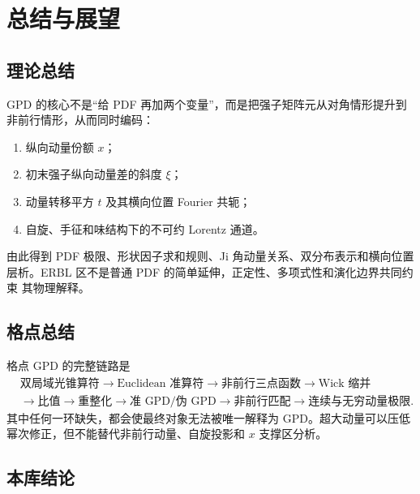 \documentclass[12pt,a4paper]{ctexart}
\theoremstyle{definition}
\begin{document}
\section{总结与展望}

\subsection{理论总结}

GPD 的核心不是“给 PDF 再加两个变量”，而是把强子矩阵元从对角情形提升到
非前行情形，从而同时编码：
\begin{enumerate}[leftmargin=*]
  \item 纵向动量份额 $x$；
  \item 初末强子纵向动量差的斜度 $\xi$；
  \item 动量转移平方 $t$ 及其横向位置 Fourier 共轭；
  \item 自旋、手征和味结构下的不可约 Lorentz 通道。
\end{enumerate}
由此得到 PDF 极限、形状因子求和规则、Ji 角动量关系、双分布表示和横向位置
层析。ERBL 区不是普通 PDF 的简单延伸，正定性、多项式性和演化边界共同约束
其物理解释。

\subsection{格点总结}

格点 GPD 的完整链路是
\begin{equation}
\begin{aligned}
&\text{双局域光锥算符}
\to\text{Euclidean 准算符}
\to\text{非前行三点函数}
\to\text{Wick 缩并}\\
&\to\text{比值}
\to\text{重整化}
\to\text{准 GPD/伪 GPD}
\to\text{非前行匹配}
\to\text{连续与无穷动量极限}.
\end{aligned}
\label{eq:gpd-full-chain}
\end{equation}
其中任何一环缺失，都会使最终对象无法被唯一解释为 GPD。超大动量可以压低
幂次修正，但不能替代非前行动量、自旋投影和 $x$ 支撑区分析。

\subsection{本库结论}
\end{document}
